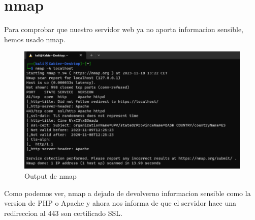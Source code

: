 \documentclass{report}
\begin{document}
        \section{nmap}
            Para comprobar que nuestro servidor web ya no aporta informacion sensible, hemos usado nmap.
            \begin{figure}[H]
                \centering
                \includegraphics[width=\textwidth]{./img/audit2/nmap1.png}
                \caption{Output de nmap}
            \end{figure}
            Como podemos ver, nmap a dejado de devolverno informacion sensible como la version de PHP o Apache y ahora nos informa de que el servidor hace una redireccion al 443 son certificado SSL.
        \clearpage
\end{document}

